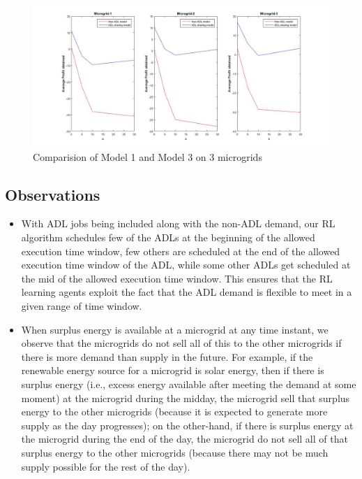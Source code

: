 \begin{figure}[thbp] \label{r1}
	\centering
	\includegraphics[scale = 0.2]{result_1.jpg}
	\caption{Comparision of Model 1 and Model 3  on 3 microgrids}
\end{figure}


\subsection{Observations}
\begin{itemize}
\item With ADL jobs being included along with the non-ADL demand, our RL algorithm schedules few of the ADLs at the beginning of the allowed execution time window, few others are scheduled at the end of the allowed execution time window of the ADL, while some other ADLs get scheduled at the mid of the allowed execution time window. This ensures that the RL learning agents exploit the fact that the ADL demand is flexible to meet in a given range of time window. %
\item When surplus energy is available at a microgrid at any time instant, we observe that the microgrids do not sell all of this to the other microgrids if there is more demand than supply in the future. For example, if the renewable energy source for a microgrid is solar energy, then if there is surplus energy (i.e., excess energy available after meeting the demand at some moment) at the microgrid during the midday, the microgrid sell that surplus energy to the other microgrids (because it is expected to generate more supply as the day progresses); on the other-hand, if there is surplus energy at the microgrid during the end of the day, the microgrid do not sell all of that surplus energy to the other microgrids (because there may not be much supply possible for the rest of the day).
\end{itemize}

